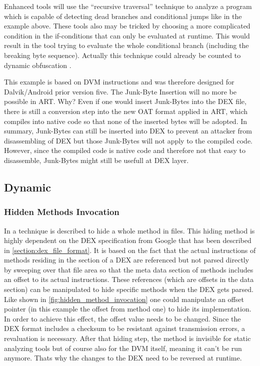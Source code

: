 Enhanced tools will use the ``recursive traversal'' technique to analyze a
program which is capable of detecting dead branches and conditional jumps like in the example above.
These tools also may be tricked by choosing a more complicated condition in the
if-conditions that can only be evaluated at runtime. This would result in the tool trying to evaluate the whole conditional branch (including the breaking byte sequence). Actually this technique could already be counted to dynamic obfuscation \parencite[p.68]{lvl_imp}.


This example is based on DVM instructions and was therefore designed for Dalvik/Android prior version five.
The Junk-Byte Insertion will no more be possible in ART. Why?
Even if one would insert Junk-Bytes into the DEX file, there is still a conversion
step into the new OAT format applied in ART, which compiles into native code so
that none of the inserted bytes will be adopted. In summary, Junk-Bytes can still be inserted into DEX to prevent an attacker from disassembling of DEX but those Junk-Bytes will not apply to the compiled code. However, since the compiled code
is native code and therefore not that easy to disassemble, Junk-Bytes might still be
usefull at DEX layer.

\subsection{Dynamic}
\subsubsection{Hidden Methods Invocation}
In \parencite[p.82f]{lvl_imp} a technique is described to hide a whole method
in  files. This hiding method is highly dependent on the DEX specification from Google \parencite{dex} that has been described in
\autoref{section:dex_file_format}.
It is based on the fact that the actual instructions of methods residing
in the  section of a DEX are referenced but not parsed directly
by sweeping over that file area so that the meta data section of methods
includes an offset to its actual instructions.
These references (which are offsets in the data section) can be manipulated
to hide specific methods when the DEX gets parsed. Like shown in
 \autoref{fig:hidden_method_invocation} one could manipulate
 an offset pointer (in this example the offset from method one)
to hide its implementation.
In order to achieve this effect, the offset value needs to be changed.
Since the DEX format includes a checksum to be resistant
against transmission errors, a revaluation is necessary.
After that hiding step, the method is invisible for static analyzing tools
but of course also for the DVM itself, meaning it can't be run anymore.
Thats why the changes to the DEX need to be reversed at runtime.

